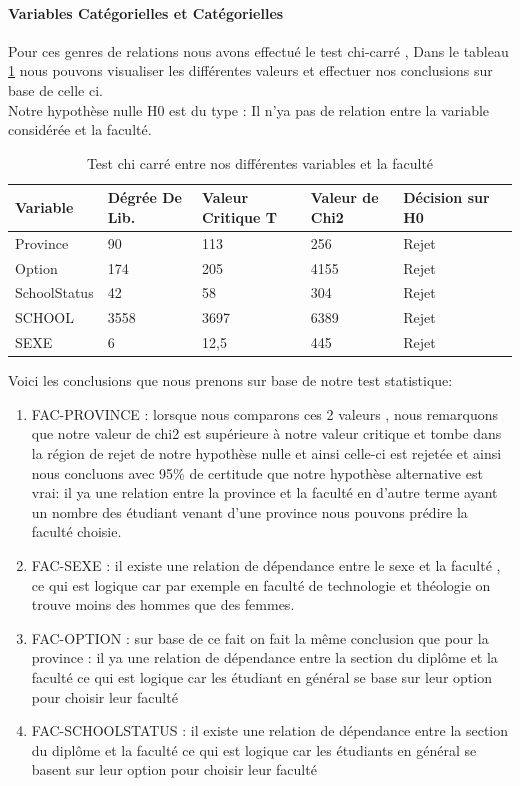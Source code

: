  \paragraph{Variables Catégorielles et Catégorielles}
 Pour ces genres de relations nous avons effectué le test chi-carré , Dans le tableau \ref{tab:chi-Carrée} nous pouvons visualiser les  différentes valeurs et effectuer nos conclusions sur base de celle ci.\\
 Notre hypothèse nulle H0 est du type : Il n'ya pas de relation entre la variable considérée et la faculté. 
 \begin{table}
 	\centering
 	\begingroup %
 	\captionsetup{type=table} %
 	\caption{Test chi carré entre  nos  différentes variables et la faculté }
 	\label{tab:chi-Carrée}
 	\begin{tabular}{lllllr}
 		\toprule
 		 Variable &   Dégrée De Lib.  &         Valeur Critique T & Valeur de Chi2 &  Décision sur H0 \\
 		\midrule
        Province & 90&113&256&Rejet\\
        Option & 174 & 205& 4155& Rejet \\
        SchoolStatus &42&58&304&Rejet\\
        SCHOOL&3558&3697&6389&Rejet\\
        SEXE&6&12,5&445&Rejet\\
 		\bottomrule
 	\end{tabular}
 	\endgroup
 \end{table}
 Voici les conclusions que nous prenons sur base de notre test statistique:
 \begin{enumerate}
 	\item FAC-PROVINCE :
 	lorsque nous comparons ces 2 valeurs , nous remarquons que notre valeur de chi2 est supérieure à notre valeur critique et tombe dans la région de rejet de notre hypothèse nulle et ainsi celle-ci est rejetée et ainsi nous concluons avec 95\% de certitude que notre hypothèse alternative est vrai: il ya une relation entre la province et la faculté en d'autre terme ayant un nombre des étudiant venant d'une province nous pouvons prédire la faculté choisie.
 	\item FAC-SEXE :
 il existe  une relation de dépendance entre le sexe et la faculté , ce qui est logique car par exemple en faculté de technologie et théologie on trouve moins des hommes que des femmes.
 	\item FAC-OPTION :
 	sur base de ce fait on fait la même conclusion que pour la province : il ya une relation de dépendance entre la section du diplôme et la faculté ce qui est logique car les étudiant en général se base sur leur option pour choisir leur faculté
 	\item FAC-SCHOOLSTATUS :
 	il existe  une relation de dépendance entre la section du diplôme et la faculté ce qui est logique car les étudiants en général se basent sur leur option pour choisir leur faculté
 \end{enumerate}
